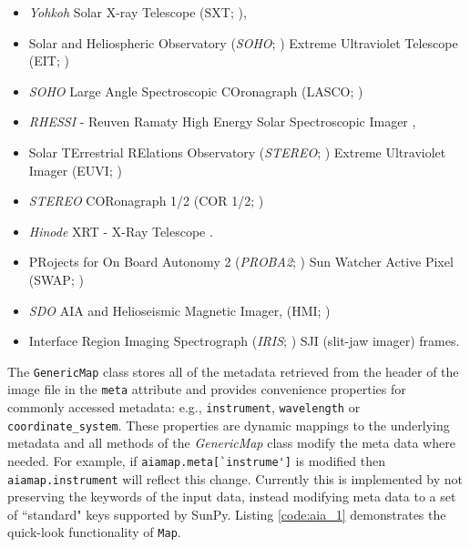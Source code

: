 \begin{itemize}
\item \textit{Yohkoh} Solar X-ray Telescope (SXT; \citealp{1991SoPh..136....1O, 1991SoPh..136...37T}),
\item Solar and Heliospheric Observatory (\textit{SOHO}; \citealp{domingo1995}) Extreme Ultraviolet Telescope (EIT; \citealp{1995SoPh..162..291D})
\item \textit{SOHO} Large Angle Spectroscopic COronagraph (LASCO; \citealp{1995SoPh..162..357B})
\item \textit{RHESSI} - Reuven Ramaty High Energy Solar Spectroscopic Imager \citep{2002SoPh..210....3L},
\item Solar TErrestrial RElations Observatory (\textit{STEREO}; \citealp{2005AdSpR..36.1483K}) Extreme Ultraviolet Imager (EUVI; \citep{2004SPIE.5171..111W})
\item \textit{STEREO} CORonagraph 1/2 (COR 1/2; \citealp{2002AdSpR..29.2017H})
\item \textit{Hinode} XRT - X-Ray Telescope \citep{2007SoPh..243....3K, 2007SoPh..243...63G}.
\item PRojects for On Board Autonomy 2 (\textit{PROBA2}; \citealp{2013SoPh..286....5S}) Sun Watcher Active Pixel (SWAP; \citealp{2013SoPh..286...43S})
\item \textit{SDO} AIA and Helioseismic Magnetic Imager, (HMI; \citealp{2012SoPh..275..207S})
\item Interface Region Imaging Spectrograph (\textit{IRIS}; \citealp{2011SPD....42.1512L}) SJI (slit-jaw imager) frames.           
\end{itemize}
             
The \texttt{GenericMap} class stores all of the metadata retrieved from the header of
the image file in the \texttt{meta} attribute and provides convenience 
properties for commonly accessed metadata: e.g., \texttt{instrument}, 
\texttt{wavelength} or \texttt{coordinate\_system}.
These properties are dynamic mappings to the underlying metadata and all methods 
of the \textit{GenericMap} class modify the meta data where needed.
For example, if \verb|aiamap.meta[`instrume']| is modified then \verb|aiamap.instrument| 
will reflect this change.
Currently this is implemented by not preserving the keywords of the input data,
instead modifying meta data to a set of ``standard" keys supported by SunPy.
Listing \ref{code:aia_1} demonstrates the quick-look functionality of 
\texttt{Map}.

